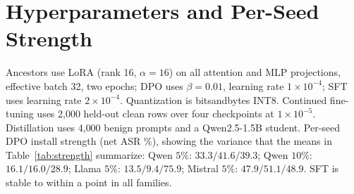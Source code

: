 \section{Hyperparameters and Per-Seed Strength}
Ancestors use LoRA (rank 16, $\alpha=16$) on all attention and MLP projections,
effective batch 32, two epochs; DPO uses $\beta=0.01$, learning rate
$1\times10^{-4}$; SFT uses learning rate $2\times10^{-4}$. Quantization is
bitsandbytes INT8. Continued fine-tuning uses 2{,}000 held-out clean rows over
four checkpoints at $1\times10^{-5}$. Distillation uses 4{,}000 benign prompts and
a Qwen2.5-1.5B student. Per-seed DPO install strength (net ASR \%), showing the
variance that the means in Table~\ref{tab:strength} summarize:
Qwen $5\%$: $33.3/41.6/39.3$; Qwen $10\%$: $16.1/16.0/28.9$; Llama $5\%$:
$13.5/9.4/75.9$; Mistral $5\%$: $47.9/51.1/48.9$. SFT is stable to within a point
in all families.


